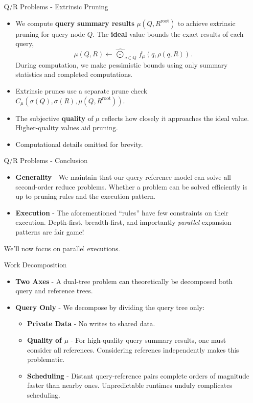 \documentclass[pdf,colorBG,slideColor]{prosper}
\newcommand{\itemt}[1]{\item {\bf #1} -}
\newcommand{\defterm}[1]{{\bf #1}}
\newcommand{\kdroot}[1]{#1^{\text{root}}}
\newcommand{\nameOp}[2]{\mathop{#1\nolimits\!\!_{#2}}}
\newcommand{\inqr}{\rho}
\newcommand{\lettermu}{\mu}
\newcommand{\inmu}{\mu}
\newcommand{\Outopmu}{\widehat{\nameOp{\bigodot}{\lettermu}}}%
\newcommand{\fmu}{f_{\!\lettermu}}
\newcommand{\canprunemu}{C_{\!\lettermu}}
\newcommand{\outstat}{\sigma}
\begin{document}
\begin{slide}{Q/R Problems - Extrinsic Pruning}
  \vspace{-.1in}
  \begin{itemize}
    \item We compute \defterm{query summary results} $\inmu(Q, \kdroot{R})$
    to achieve extrinsic pruning for query node $Q$.
    The \defterm{ideal} value bounds the exact results of each query,
      \begin{equation*}
      \inmu(Q, R) \gets \Outopmu_{q \in Q} \fmu(q, \inqr(q, R)).
      \end{equation*}
    During computation, we make pessimistic bounds using only
    summary statistics and completed computations.
    \item Extrinsic prunes use a separate prune check $\canprunemu(\outstat(Q), \outstat(R), \inmu(Q, \kdroot{R}))$.
    \item The subjective \defterm{quality} of $\lettermu$ reflects how
    closely it approaches the ideal value.
    Higher-quality values aid pruning.
    \item Computational details omitted for brevity.
  \end{itemize}
\end{slide}

\begin{slide}{Q/R Problems - Conclusion}
  \begin{itemize}
    \itemt{Generality}
    We maintain that our query-reference model can solve all second-order reduce problems.
    Whether a problem can be solved efficiently is up to pruning rules and the execution pattern.
    \itemt{Execution}
    The aforementioned ``rules'' have few constraints on their execution.
    Depth-first, breadth-first, and importantly {\em parallel} expansion patterns are fair game!
  \end{itemize}
  
  We'll now focus on parallel executions.
\end{slide}

\begin{slide}{Work Decomposition}
  \begin{itemize}
    \itemt{Two Axes}
    A dual-tree problem can theoretically be decomposed both query and reference trees.
    \itemt{Query Only}
    We decompose by dividing the query tree only:
    \begin{itemize}
      \itemt{Private Data}
      No writes to shared data.
      \itemt{Quality of $\lettermu$}
      For high-quality query summary results, one must consider all references.
      Considering referenes independently makes this problematic.
      \itemt{Scheduling}
      Distant query-reference pairs complete orders of magnitude faster than
      nearby ones.
      Unpredictable runtimes unduly complicates scheduling.
    \end{itemize}
  \end{itemize}
\end{slide}
\end{document}
